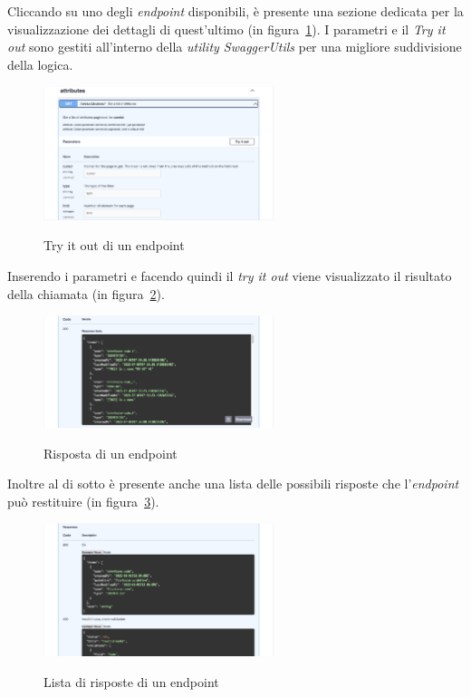 Cliccando su uno degli \textit{endpoint} disponibili, è presente una sezione dedicata per la visualizzazione dei dettagli di quest'ultimo (in figura~\ref{fig:try-it-out}).
I parametri e il \textit{Try it out} sono gestiti all'interno della \textit{utility SwaggerUtils} per una migliore suddivisione della logica.

\begin{figure}[ht]
  \centering
  \includegraphics[width=0.6\textwidth, alt={Sezione try it out di un endpoint}]{images/frontend/TryItOut.jpg}
  \caption{Try it out di un endpoint}\label{fig:try-it-out}
\end{figure}

Inserendo i parametri e facendo quindi il \textit{try it out} viene visualizzato il risultato della chiamata (in figura~\ref{fig:risposta-endpoint}).

\begin{figure}[ht]
  \centering
  \includegraphics[width=0.6\textwidth, alt={Sezione per la visualizzazione della risposta di un endpoint}]{images/frontend/TryItOut3.jpg}
  \caption{Risposta di un endpoint}\label{fig:risposta-endpoint}
\end{figure}

Inoltre al di sotto è presente anche una lista delle possibili risposte che l'\textit{endpoint} può restituire (in figura~\ref{fig:response-list}).

\begin{figure}[ht]
  \centering
  \includegraphics[width=0.6\textwidth, alt={Sezione per la visualizzazione delle possibili risposte di un endpoint}]{images/frontend/TryItOut4.jpg}
  \caption{Lista di risposte di un endpoint}\label{fig:response-list}
\end{figure}

